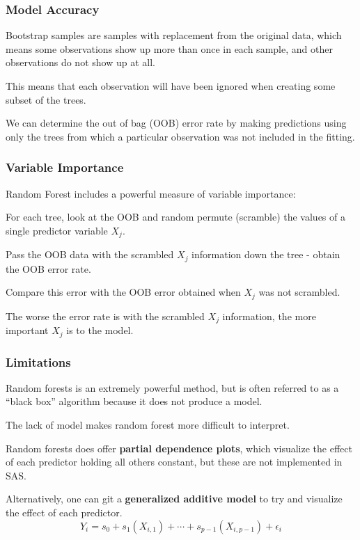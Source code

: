 \documentclass[12pt]{notes}
\begin{document}
\subsubsection{Model Accuracy}
\bi
\item Bootstrap samples are samples with replacement from the original data, which means some observations show up more than once in each sample, and other observations do not show up at all. 
\item This means that each observation will have been ignored when creating some subset of the trees. 
\item We can determine the out of bag (OOB) error rate by making predictions using only the trees from which a particular observation was not included in the fitting. 
\ei

\subsubsection{Variable Importance}
Random Forest includes a powerful measure of variable importance:
\bi
\item For each tree, look at the OOB and random permute (scramble) the values of a single predictor variable $X_j$.
\item Pass the OOB data with the scrambled $X_j$ information down the tree - obtain the OOB error rate. 
\item Compare this error with the OOB error obtained when $X_j$ was not scrambled. 
\item The worse the error rate is with the scrambled $X_j$ information, the more important $X_j$ is to the model. 
\ei


\subsubsection{Limitations}
\bi
\item Random forests is an extremely powerful method, but is often referred to as a ``black box'' algorithm because it does not produce a model. 
\item The lack of model makes random forest more difficult to interpret. 
\item Random forests does offer \textbf{partial dependence plots}, which visualize the effect of each predictor holding all others constant, but these are not implemented in SAS. 
\item Alternatively, one can git a \textbf{generalized additive model} to try and visualize the effect of each predictor. 
$$Y_i = s_0 + s_1\left(X_{i, 1}\right) + \cdots + s_{p-1}\left(X_{i, p-1}\right) + \epsilon_i$$
\ei
\end{document}
